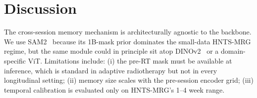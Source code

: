 \section{Discussion}
\label{sec:discussion}

The cross-session memory mechanism is architecturally agnostic to the
backbone. We use SAM2~\cite{ravi2024sam2} because its 1B-mask prior
dominates the small-data HNTS-MRG regime, but the same module could in
principle sit atop DINOv2~\cite{oquab2024dinov2} or a domain-specific
ViT. Limitations include: (i) the pre-RT mask must be available at
inference, which is standard in adaptive radiotherapy but not in every
longitudinal setting; (ii) memory size scales with the pre-session
encoder grid; (iii) temporal calibration is evaluated only on HNTS-MRG's
1--4 week range.
